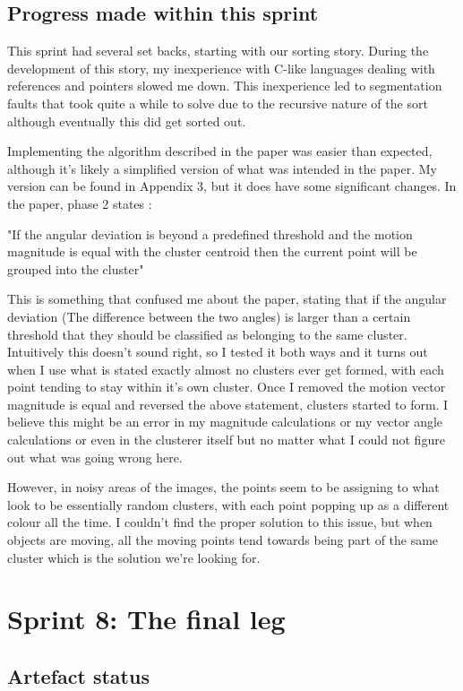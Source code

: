 \subsection{Progress made within this sprint}
This sprint had several set backs, starting with our sorting story. During the development of this story, my inexperience with C-like languages dealing with references and pointers slowed me down. This inexperience led to segmentation faults that took quite a while to solve due to the recursive nature of the sort although eventually this did get sorted out.

Implementing the algorithm described in the paper was easier than expected, although it's likely a simplified version of what was intended in the paper. My version can be found in Appendix 3, but it does have some significant changes. In the paper, phase 2 states :

 "If the angular deviation is beyond a predefined threshold and the motion magnitude is equal with the cluster centroid then the current point will be grouped into the cluster"
 
 This is something that confused me about the paper, stating that if the angular deviation (The difference between the two angles) is larger than a certain threshold that they should be classified as belonging to the same cluster. Intuitively this doesn't sound right, so I tested it both ways and it turns out when I use what is stated exactly almost no clusters ever get formed, with each point tending to stay within it's own cluster. Once I removed the motion vector magnitude is equal and reversed the above statement, clusters started to form. I believe this might be an error in my magnitude calculations or my vector angle calculations or even in the clusterer itself but no matter what I could not figure out what was going wrong here.
 
 However, in noisy areas of the images, the points seem to be assigning to what look to be essentially random clusters, with each point popping up as a different colour all the time. I couldn't find the proper solution to this issue, but when objects are moving, all the moving points tend towards being part of the same cluster which is the solution we're looking for.
\clearpage
\section{Sprint 8: The final leg}
\subsection{Artefact status}

